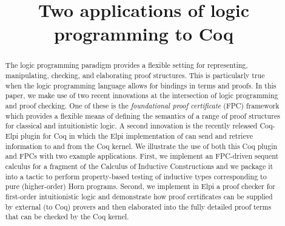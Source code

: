 \documentclass[a4paper,USenglish,cleveref, autoref, thm-restate]{lipics-v2019}
\title{Two applications of logic programming to Coq}
\begin{document}
\maketitle

\begin{abstract}
The logic programming paradigm provides a flexible setting for
representing, manipulating, checking, and elaborating proof
structures.  This is particularly true when the logic programming
language allows for bindings in terms and proofs.  In this paper,
we make use of two recent innovations at the intersection of logic
programming and proof checking.  One of these is the
\emph{foundational proof certificate} (FPC) framework which provides a
flexible means of defining the semantics of a range of proof
structures for classical and intuitionistic logic.  A second
innovation is the recently released Coq-Elpi plugin for Coq in which
the Elpi implementation of \lP can send and retrieve information to
and from the Coq kernel.  We illustrate the use of both this Coq
plugin and FPCs with two example applications.  First, we implement an
FPC-driven sequent calculus for a fragment of the Calculus of
Inductive Constructions and we package it into a tactic to perform
property-based testing of inductive types corresponding to pure
(higher-order) Horn programs.  Second, we implement in Elpi a proof
checker for first-order intuitionistic logic and demonstrate how proof
certificates can be supplied by external (to Coq) provers and then
elaborated into the fully detailed proof terms that can be checked by
the Coq kernel.
\end{abstract}
 








\appendix

\end{document}
